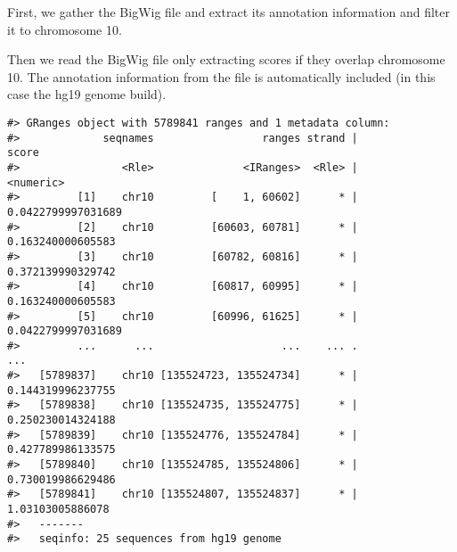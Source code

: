 \documentclass[10pt,letterpaper]{article}
\newenvironment{Shaded}{\begin{snugshade}}{\end{snugshade}}
\newcommand{\KeywordTok}[1]{\textcolor[rgb]{0.13,0.29,0.53}{\textbf{#1}}}
\newcommand{\DataTypeTok}[1]{\textcolor[rgb]{0.13,0.29,0.53}{#1}}
\newcommand{\StringTok}[1]{\textcolor[rgb]{0.31,0.60,0.02}{#1}}
\newcommand{\OperatorTok}[1]{\textcolor[rgb]{0.81,0.36,0.00}{\textbf{#1}}}
\newcommand{\NormalTok}[1]{#1}
\begin{document}
First, we gather the BigWig file and extract its annotation information
and filter it to chromosome 10.

\begin{Shaded}
\end{Shaded}

Then we read the BigWig file only extracting scores if they overlap
chromosome 10. The annotation information from the file is automatically
included (in this case the hg19 genome build).

\begin{Shaded}
\end{Shaded}

\begin{verbatim}
#> GRanges object with 5789841 ranges and 1 metadata column:
#>             seqnames                 ranges strand |              score
#>                <Rle>              <IRanges>  <Rle> |          <numeric>
#>         [1]    chr10         [    1, 60602]      * | 0.0422799997031689
#>         [2]    chr10         [60603, 60781]      * |  0.163240000605583
#>         [3]    chr10         [60782, 60816]      * |  0.372139990329742
#>         [4]    chr10         [60817, 60995]      * |  0.163240000605583
#>         [5]    chr10         [60996, 61625]      * | 0.0422799997031689
#>         ...      ...                    ...    ... .                ...
#>   [5789837]    chr10 [135524723, 135524734]      * |  0.144319996237755
#>   [5789838]    chr10 [135524735, 135524775]      * |  0.250230014324188
#>   [5789839]    chr10 [135524776, 135524784]      * |  0.427789986133575
#>   [5789840]    chr10 [135524785, 135524806]      * |  0.730019986629486
#>   [5789841]    chr10 [135524807, 135524837]      * |   1.03103005886078
#>   -------
#>   seqinfo: 25 sequences from hg19 genome
\end{verbatim}
\end{document}
